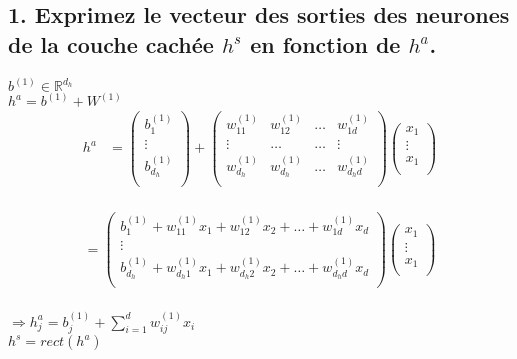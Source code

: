 \documentclass[12pt]{article}
\begin{document}
\subsection{1. Exprimez le vecteur des sorties des neurones de la couche cachée $h^{s}$ en fonction de $h^{a}$.}

$b^{(1)} \in \mathbb{R}^{d_{h}}$ \\
$h^{a}=b^{(1)}+W^{(1)}$ \\

\begin{align*} 
  h^{a}
    &=
    \left(
      \begin{array}{r}
        b_{1}^{(1)} \\
          \vdots \\
          b_{d_{h}}^{(1)} \\
      \end{array}
     \right) + 
     \left(
       \begin{array}{rrrr}
         w_{11}^{(1)} &   w_{12}^{(1)} &   \dots &    w_{1d}^{(1)} \\
        \vdots &  \dots &   \dots&   \vdots \\
         w_{d_{h}}^{(1)} &   w_{d_{h}}^{(1)} &   \dots &    w_{d_{h}d}^{(1)}   \\
       \end{array}
      \right) 
      \left(
        \begin{array}{r}
        x_{1} \\
          \vdots \\
          x_{1} \\
        \end{array}
      \right)
\end{align*} \\
\begin{align*} 
     = \left(
       \begin{array}{r}
         b_{1}^{(1)}+w_{11}^{(1)}x_{1} +   w_{12}^{(1)}x_{2}  +   \dots  +    w_{1d}^{(1)}x_{d} \\
        \vdots\\
        b_{d_{h}}^{(1)}+w_{d_{h}1}^{(1)}x_{1} +   w_{d_{h}2}^{(1)}x_{2}  +   \dots  +    w_{d_{h}d}^{(1)}x_{d} \\
       \end{array}
      \right) 
      \left(
        \begin{array}{r}
        x_{1} \\
          \vdots \\
          x_{1} \\
        \end{array}
      \right)
\end{align*}
\\
$\Rightarrow h_{j}^{a}=b_{j}^{(1)}+\sum_{i=1}^{d}w_{ij}^{(1)}x_{i}$ \\
$h^{s}=rect(h^{a})$
\end{document}
